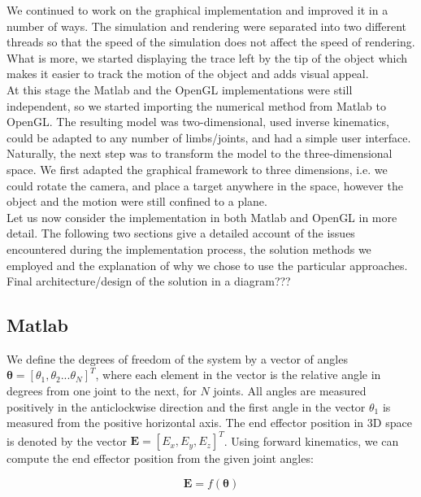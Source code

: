 \documentclass[paper=a4, fontsize=11pt]{scrartcl} %
\numberwithin{equation}{section} %
\numberwithin{figure}{section} %
\numberwithin{table}{section} %
\newcommand{\vect}[1]{\mathbf{#1}}
\newcommand{\params}{\boldsymbol{\theta}}
\begin{document}
We continued to work on the graphical implementation and improved it in a number of ways. The simulation and rendering were separated into two different threads so that the speed of the simulation does not affect the speed of rendering. What is more, we started displaying the trace left by the tip of the object which makes it easier to track the motion of the object and adds visual appeal. \\

At this stage the Matlab and the OpenGL implementations were still independent, so we started importing the numerical method from Matlab to OpenGL. The resulting model was two-dimensional, used inverse kinematics, could be adapted to any number of limbs/joints, and had a simple user interface. \\

Naturally, the next step was to transform the model to the three-dimensional space. We first adapted the graphical framework to three dimensions, i.e. we could rotate the camera, and place a target anywhere in the space, however the object and the motion were still confined to a plane. \\

Let us now consider the implementation in both Matlab and OpenGL in more detail. The following two sections give a detailed account of the issues encountered during the implementation process, the solution methods we employed and the explanation of why we chose to use the particular approaches. \\

Final architecture/design of the solution in a diagram???

\subsection{Matlab}

We define the degrees of freedom of the system by a vector of angles $\params = [\theta_1, \theta_2...\theta_N]^T$, where each element in the vector is the relative angle in degrees from one joint to the next, for $N$ joints. All angles are measured positively in the anticlockwise direction and the first angle in the vector $\theta_1$ is measured from the positive horizontal axis. The end effector position in 3D space is denoted by the vector 
$\vect{E} = [E_x, E_y, E_z]^T$. Using forward kinematics, we can compute the end effector position from the given joint angles:

\begin{equation}
\vect{E} = f(\params)
\end{equation}
\end{document}
